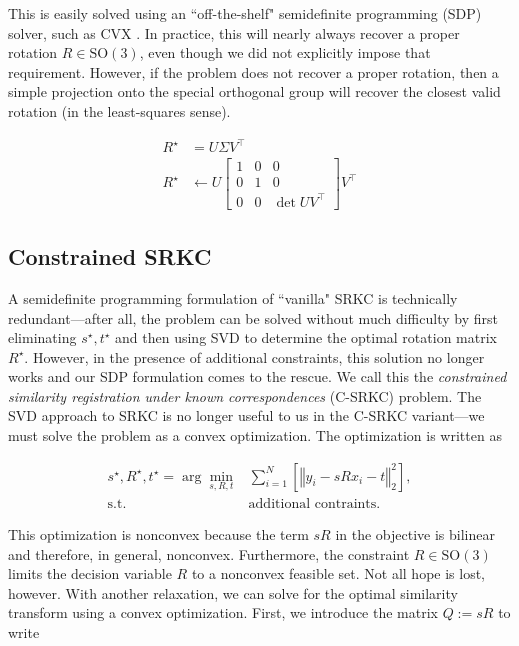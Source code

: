 \documentclass[conference]{IEEEtran}
\begin{document}
This is easily solved using an ``off-the-shelf" semidefinite programming (SDP) solver, such as CVX \cite{cvx}.  In practice, this will nearly always recover a proper rotation \( R \in \mathrm{SO(3)} \), even though we did not explicitly impose that requirement.  However, if the problem does not recover a proper rotation, then a simple projection onto the special orthogonal group will recover the closest valid rotation (in the least-squares sense).

\begin{align}
	R^\star &= U \Sigma V^\top \\
	R^\star &\gets U \begin{bmatrix}
		1 & 0 & 0 \\
		0 & 1 & 0 \\
		0 & 0 & \det U V^\top
	\end{bmatrix} V^\top
\end{align}

\subsection{Constrained SRKC}

A semidefinite programming formulation of ``vanilla" SRKC is technically redundant---after all, the problem can be solved without much difficulty by first eliminating \( s^\star, t^\star \) and then using SVD to determine the optimal rotation matrix \( R^\star \).  However, in the presence of additional constraints, this solution no longer works and our SDP formulation comes to the rescue.  We call this the \textit{constrained similarity registration under known correspondences} (C-SRKC) problem.  The SVD approach to SRKC is no longer useful to us in the C-SRKC variant---we must solve the problem as a convex optimization.  The optimization is written as

\begin{align}
	s^\star, R^\star, t^\star = \arg\min_{s, R, t} & \sum_{i=1}^N \left[\left\Vert y_i - s R x_i - t \right\Vert_2^2 \right] , \\
	\text{s.t. } & \text{additional contraints} .
\end{align}

This optimization is nonconvex because the term \( s R \) in the objective is bilinear and therefore, in general, nonconvex.  Furthermore, the constraint \( R \in \mathrm{SO(3)} \) limits the decision variable \( R \) to a nonconvex feasible set.  Not all hope is lost, however.  With another relaxation, we can solve for the optimal similarity transform using a convex optimization.  First, we introduce the matrix \( Q := s R \) to write
\end{document}
